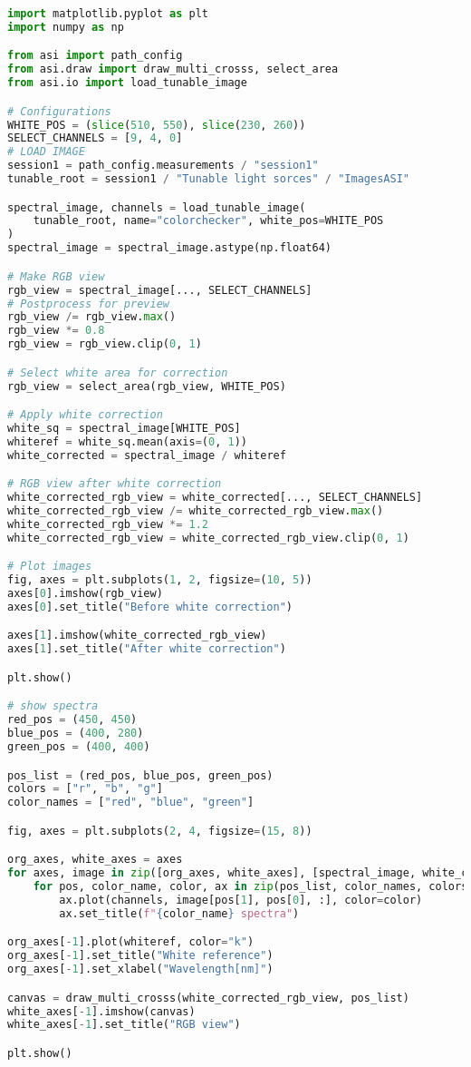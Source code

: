 \begin{lstlisting}[language=python, caption=White correction for Tunable Light Sources with small white reference, label={code:wc-tunable}]
import matplotlib.pyplot as plt
import numpy as np

from asi import path_config
from asi.draw import draw_multi_crosss, select_area
from asi.io import load_tunable_image

# Configurations
WHITE_POS = (slice(510, 550), slice(230, 260))
SELECT_CHANNELS = [9, 4, 0]
# LOAD IMAGE
session1 = path_config.measurements / "session1"
tunable_root = session1 / "Tunable light sorces" / "ImagesASI"

spectral_image, channels = load_tunable_image(
    tunable_root, name="colorchecker", white_pos=WHITE_POS
)
spectral_image = spectral_image.astype(np.float64)

# Make RGB view
rgb_view = spectral_image[..., SELECT_CHANNELS]
# Postprocess for preview
rgb_view /= rgb_view.max()
rgb_view *= 0.8
rgb_view = rgb_view.clip(0, 1)

# Select white area for correction
rgb_view = select_area(rgb_view, WHITE_POS)

# Apply white correction
white_sq = spectral_image[WHITE_POS]
whiteref = white_sq.mean(axis=(0, 1))
white_corrected = spectral_image / whiteref

# RGB view after white correction
white_corrected_rgb_view = white_corrected[..., SELECT_CHANNELS]
white_corrected_rgb_view /= white_corrected_rgb_view.max()
white_corrected_rgb_view *= 1.2
white_corrected_rgb_view = white_corrected_rgb_view.clip(0, 1)

# Plot images
fig, axes = plt.subplots(1, 2, figsize=(10, 5))
axes[0].imshow(rgb_view)
axes[0].set_title("Before white correction")

axes[1].imshow(white_corrected_rgb_view)
axes[1].set_title("After white correction")

plt.show()

# show spectra
red_pos = (450, 450)
blue_pos = (400, 280)
green_pos = (400, 400)

pos_list = (red_pos, blue_pos, green_pos)
colors = ["r", "b", "g"]
color_names = ["red", "blue", "green"]

fig, axes = plt.subplots(2, 4, figsize=(15, 8))

org_axes, white_axes = axes
for axes, image in zip([org_axes, white_axes], [spectral_image, white_corrected]):
    for pos, color_name, color, ax in zip(pos_list, color_names, colors, axes):
        ax.plot(channels, image[pos[1], pos[0], :], color=color)
        ax.set_title(f"{color_name} spectra")

org_axes[-1].plot(whiteref, color="k")
org_axes[-1].set_title("White reference")
org_axes[-1].set_xlabel("Wavelength[nm]")

canvas = draw_multi_crosss(white_corrected_rgb_view, pos_list)
white_axes[-1].imshow(canvas)
white_axes[-1].set_title("RGB view")

plt.show()
\end{lstlisting}